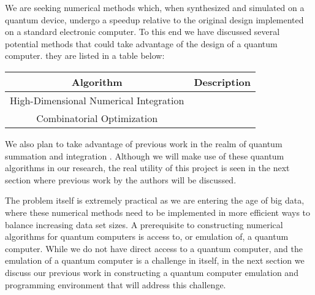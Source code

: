 


We are seeking numerical methods which, when synthesized and simulated on a quantum device, undergo a speedup relative to the original design implemented on a standard electronic computer. To this end we have discussed several potential methods that could take advantage of the design of a quantum computer. they are listed in a table below: 

\begin{center}
\begin{tabular}{|c|c|}
\hline
Algorithm&Description\\ 
\hline 
High-Dimensional Numerical Integration&\\ 
\hline
Combinatorial Optimization&\\
\hline
\end{tabular}
\end{center}

We also plan to take advantage of previous work in the realm of quantum summation and integration \cite{Traub:2002}. Although we will make use of these quantum algorithms in our research, the real utility of this project is seen in the next section where previous work by the authors will be discussed. 

The problem itself is extremely practical as we are entering the age of big data, where these numerical methods need to be implemented in more efficient ways to balance increasing data set sizes. A prerequisite to constructing numerical algorithms for quantum computers is access to, or emulation of, a quantum computer. While we do not have direct access to a quantum computer, and the emulation of a quantum computer is a challenge in itself, in the next section we discuss our previous work in constructing a quantum computer emulation and programming environment that will address this challenge.


